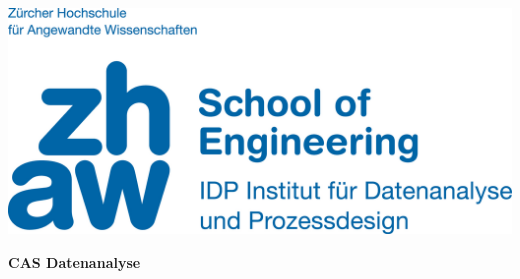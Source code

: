 \noindent
\begin{minipage}[t]{0.4\textwidth} 
\includegraphics[width=\linewidth]{logo.jpg}
\end{minipage}%
\hfill%
\begin{minipage}[t]{0.4\textwidth}\raggedleft
\textbf{\large \the\month \the\year}
\end{minipage}

\begin{center}
 \textbf{\large CAS Datenanalyse} \\
 \vspace{0.3cm}
\end{center}
